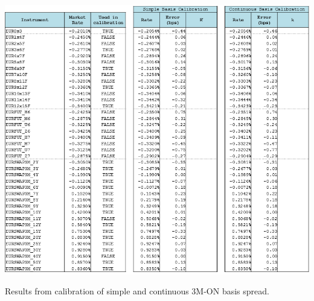 \documentclass{article}
\begin{document}
\begin{table}[p]
\centering
\includegraphics[width=1\textwidth]{3mBasisFit.png}
\caption{Results from calibration of simple and continuous 3M-ON basis spread.}
\label{3mBasisFit}
\end{table}
\end{document}
